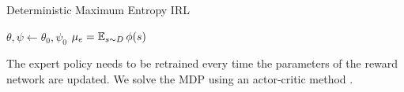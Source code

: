 \begin{algorithm}[tbhp]
	\caption{Deterministic Maximum Entropy IRL}
	\label{deterministic-medirl}
	
	
	
	\BlankLine
	$\theta, \psi \gets \theta_0, \psi_0$ \DontPrintSemicolon {} 
	$\mu_e= \operatorname*{\mathbb{E}}_{s \sim D}{\phi(s)}$ \DontPrintSemicolon {}
	\BlankLine
	
\end{algorithm}

The expert policy needs to be retrained every time the parameters of the reward network are updated. We solve the MDP using an actor-critic method \cite{mnih_actor_critic_2016}.


